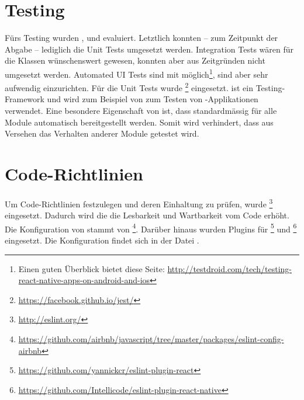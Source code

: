 \section{Testing}
\label{pd-entwicklungsumgebung-testing}
Fürs Testing wurden ,  und  evaluiert.
Letztlich konnten -- zum Zeitpunkt der Abgabe -- lediglich die Unit Tests umgesetzt werden.
Integration Tests wären für die  Klassen wünschenswert gewesen, konnten aber aus Zeitgründen nicht umgesetzt werden.
Automated UI Tests sind mit  möglich\footnote{Einen guten Überblick bietet diese Seite: \url{http://testdroid.com/tech/testing-react-native-apps-on-android-and-ios}}, sind aber sehr aufwendig einzurichten.
Für die Unit Tests wurde \footnote{\url{https://facebook.github.io/jest/}} eingesetzt. 
 ist ein  Testing-\gls{Framework} und wird zum Beispiel von  zum Testen von -Applikationen verwendet.\newline
Eine besondere Eigenschaft von  ist, dass standardmässig für alle Module automatisch  bereitgestellt werden.
Somit wird verhindert, dass aus Versehen das Verhalten anderer Module getestet wird.

\section{Code-Richtlinien}
\label{pd-entwicklungsumgebung-cr}
Um Code-Richtlinien festzulegen und deren Einhaltung zu prüfen, wurde \footnote{\url{http://eslint.org/}} eingesetzt.
Dadurch wird die die Lesbarkeit und Wartbarkeit vom Code erhöht.
Die Konfiguration von  stammt von \footnote{\url{https://github.com/airbnb/javascript/tree/master/packages/eslint-config-airbnb}}.
Darüber hinaus wurden Plugins für \footnote{\url{https://github.com/yannickcr/eslint-plugin-react}} und \footnote{\url{https://github.com/Intellicode/eslint-plugin-react-native}} eingesetzt.\newline
Die Konfiguration findet sich in der Datei .
